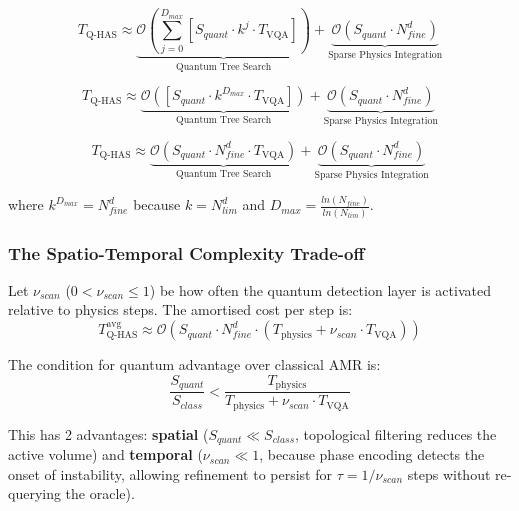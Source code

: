 \documentclass[12pt, a4paper, oneside]{report}
\begin{document}
\begin{equation}
    T_{\text{Q-HAS}} \approx \underbrace{\mathcal{O}\left(\sum_{j=0}^{D_{max}} \left[ S_{quant} \cdot k^j \cdot T_{\text{VQA}} \right]\right)}_{\text{Quantum Tree Search}} + \underbrace{\mathcal{O}\left( S_{quant} \cdot N_{fine}^d \right)}_{\text{Sparse Physics Integration}}
\end{equation}

\begin{equation}
    T_{\text{Q-HAS}} \approx \underbrace{\mathcal{O}\left(\left[ S_{quant} \cdot k^{D_{max}} \cdot T_{\text{VQA}} \right]\right)}_{\text{Quantum Tree Search}} + \underbrace{\mathcal{O}\left( S_{quant} \cdot N_{fine}^d \right)}_{\text{Sparse Physics Integration}}
\end{equation}

\begin{equation}
    T_{\text{Q-HAS}} \approx \underbrace{\mathcal{O}\left( S_{quant} \cdot N_{fine}^d \cdot T_{\text{VQA}} \right)}_{\text{Quantum Tree Search}} + \underbrace{\mathcal{O}\left( S_{quant} \cdot N_{fine}^d \right)}_{\text{Sparse Physics Integration}}
\end{equation}

\noindent where $k^{D_{max}} = N_{fine}^d$ because $k = N_{lim}^d$ and $D_{max}=\frac{ln(N_{fine})}{ln(N_{lim})}$.
\subsubsection{The Spatio-Temporal Complexity Trade-off}
Let $\nu_{scan}$ ($0 < \nu_{scan} \le 1$) be how often the quantum detection layer is activated relative to physics steps. The amortised cost per step is:
\begin{equation}
    T_{\text{Q-HAS}}^{\text{avg}} \approx \mathcal{O}\left(S_{quant} \cdot N_{fine}^d \cdot (T_{\text{physics}} + \nu_{scan} \cdot T_{\text{VQA}})\right)
\end{equation}

The condition for quantum advantage over classical AMR is:
\begin{equation}
    \frac{S_{quant}}{S_{class}} < \frac{T_{\text{physics}}}{T_{\text{physics}} + \nu_{scan} \cdot T_{\text{VQA}}}
\end{equation}

This has 2 advantages: \textbf{spatial} ($S_{quant} \ll S_{class}$, topological filtering reduces the active volume) and \textbf{temporal} ($\nu_{scan} \ll 1$, because phase encoding detects the onset of instability, allowing refinement to persist for $\tau = 1/\nu_{scan}$ steps without re-querying the oracle).
\end{document}
